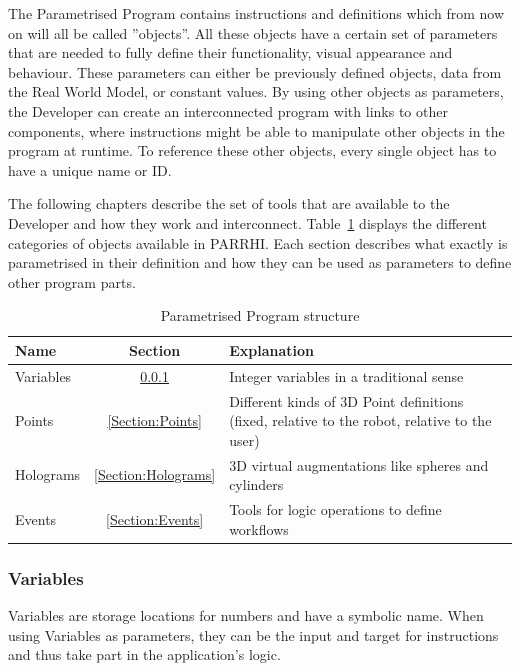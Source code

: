 The Parametrised Program contains instructions and definitions which from now on will all be called ”objects”. All these objects have a certain set of parameters that are needed to fully define their functionality, visual appearance and behaviour. These parameters can either be previously defined objects, data from the Real World Model, or constant values. By using other objects as parameters, the Developer can create an interconnected program with links to other components, where instructions might be able to manipulate other objects in the program at runtime. To reference these other objects, every single object has to have a unique name or ID.

The following chapters describe the set of tools that are available to the Developer and how they work and interconnect. Table~\ref{Table:InputDataStructure} displays the different categories of objects available in PARRHI. Each section describes what exactly is parametrised in their definition and how they can be used as parameters to define other program parts.

\begin{table}[ht]
	\caption{Parametrised Program structure}
	\label{Table:InputDataStructure}
	\centering
	\begin{tabular}{lcl}
		\toprule
		Name & Section		& Explanation	\\		
		\midrule
		Variables & \ref{Section:Variables}		& Integer variables in a traditional sense \\
		Points& \ref{Section:Points}		& \parbox[t]{10cm}{Different kinds of 3D Point definitions\\(fixed, relative to the robot, relative to the user)} 	 \\
		Holograms& \ref{Section:Holograms} & 3D virtual augmentations like spheres and cylinders\\
		Events& \ref{Section:Events} & Tools for logic operations to define workflows \\
		\bottomrule
	\end{tabular}
\end{table}

\subsubsection{Variables}\label{Section:Variables}

Variables are storage locations for numbers and have a symbolic name. When using Variables as parameters, they can be the input and target for instructions and thus take part in the application's logic.


